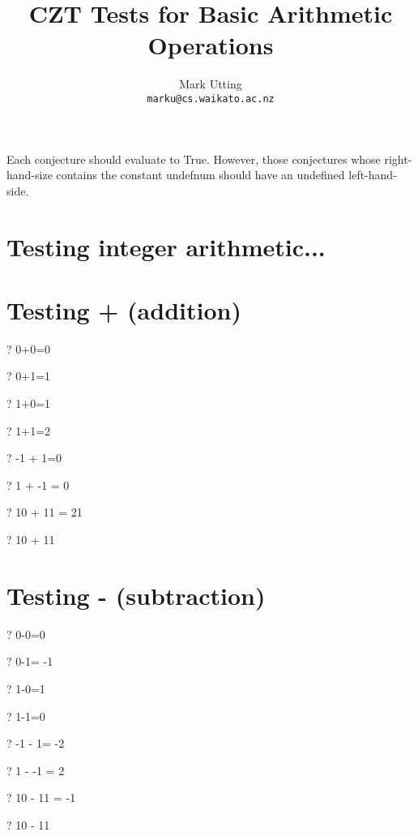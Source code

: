 \documentclass{article}
\title{CZT Tests for Basic Arithmetic Operations}
\author{Mark Utting \\ \texttt{marku@cs.waikato.ac.nz}}
\newcommand{\negate}{-}
\begin{document}
\maketitle

Each conjecture should evaluate to True.
However, those conjectures whose right-hand-size contains
the constant undefnum should have an undefined left-hand-side.


\section{Testing integer arithmetic...}

\section{Testing + (addition)}
\begin{zed} \vdash?   0+0=0 \end{zed}
\begin{zed} \vdash?   0+1=1 \end{zed}
\begin{zed} \vdash?   1+0=1 \end{zed}
\begin{zed} \vdash?   1+1=2 \end{zed}
\begin{zed} \vdash?   \negate 1 + 1=0 \end{zed}
\begin{zed} \vdash?   1 + \negate 1 = 0 \end{zed}
\begin{zed} \vdash?   10 + 11 = 21 \end{zed}
\begin{zed} \vdash?   10 + 11  \end{zed}


\section{Testing - (subtraction)}
\begin{zed} \vdash?   0-0=0 \end{zed}
\begin{zed} \vdash?   0-1= \negate 1 \end{zed}
\begin{zed} \vdash?   1-0=1 \end{zed}
\begin{zed} \vdash?   1-1=0 \end{zed}
\begin{zed} \vdash?   \negate 1 - 1= \negate 2 \end{zed}
\begin{zed} \vdash?   1 - \negate 1 = 2 \end{zed}
\begin{zed} \vdash?   10 - 11 = \negate 1 \end{zed}
\begin{zed} \vdash?   10 - 11  \end{zed}
\end{document}
